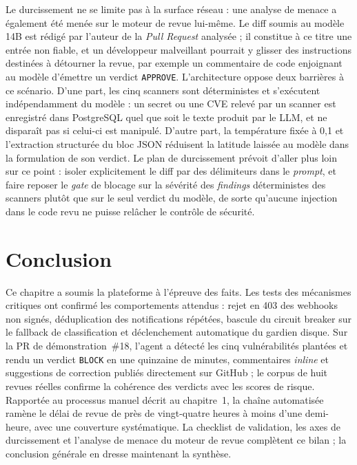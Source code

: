         Le durcissement ne se limite pas à la surface réseau : une analyse de menace a
        également été menée sur le moteur de revue lui-même. Le diff soumis au modèle
        14B est rédigé par l'auteur de la \textit{Pull Request} analysée ; il constitue
        à ce titre une entrée non fiable, et un développeur malveillant pourrait y
        glisser des instructions destinées à détourner la revue, par exemple un
        commentaire de code enjoignant au modèle d'émettre un verdict \texttt{APPROVE}.
        L'architecture oppose deux barrières à ce scénario. D'une part, les cinq
        scanners sont déterministes et s'exécutent indépendamment du modèle : un secret
        ou une CVE relevé par un scanner est enregistré dans PostgreSQL quel que soit
        le texte produit par le LLM, et ne disparaît pas si celui-ci est manipulé.
        D'autre part, la température fixée à 0,1 et l'extraction structurée du bloc
        JSON réduisent la latitude laissée au modèle dans la formulation de son
        verdict. Le plan de durcissement prévoit d'aller plus loin sur ce point :
        isoler explicitement le diff par des délimiteurs dans le \textit{prompt}, et
        faire reposer le \textit{gate} de blocage sur la sévérité des \textit{findings}
        déterministes des scanners plutôt que sur le seul verdict du modèle, de sorte
        qu'aucune injection dans le code revu ne puisse relâcher le contrôle de
        sécurité.

\section*{Conclusion}

Ce chapitre a soumis la plateforme à l'épreuve des faits. Les tests des
mécanismes critiques ont confirmé les comportements attendus : rejet en 403 des webhooks
non signés, déduplication des notifications répétées, bascule du circuit breaker sur le
fallback de classification et déclenchement automatique du gardien disque. Sur la PR de
démonstration~\#18, l'agent a détecté les cinq vulnérabilités plantées et rendu un
verdict \texttt{BLOCK} en une quinzaine de minutes, commentaires \textit{inline} et
suggestions de correction publiés directement sur GitHub ; le corpus de huit revues
réelles confirme la cohérence des verdicts avec les scores de risque. Rapportée au
processus manuel décrit au chapitre~1, la chaîne automatisée ramène le délai de revue de
près de vingt-quatre heures à moins d'une demi-heure, avec une couverture systématique.
La checklist de validation, les axes de durcissement et l'analyse de menace du moteur de
revue complètent ce bilan ; la conclusion générale en dresse maintenant la synthèse.
